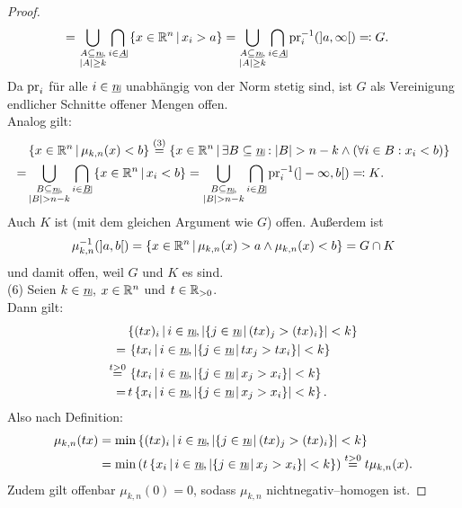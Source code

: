 \begin{proof}
\begin{align*}
=\,&\bigcup_{\substack{A \subseteq \haken n,\\ \abs A \ge k}}
\bigcap_{i \in \haken A}\menge{x \in \R^n}{x_i> a}
= \bigcup_{\substack{A \subseteq \haken n,\\ \abs A \ge k}}
\bigcap_{i \in \haken A} \pr_i\inv(]a, \infty[) \eqqcolon G\text.
\end{align*}
Da $\mathop{\textrm{pr}}\nolimits_i$ für alle $i \in \haken n$ unabhängig von der Norm stetig sind, ist
$G$ als Vereinigung endlicher Schnitte offener Mengen offen.\\
Analog gilt:
\begin{align*}
&\menge{x \in \R^n}{\mu_{k, n}(x)< b}
\overset{(3)}= \menge{x \in \R^n}{\exists B \subseteq \haken n: \abs B
>n- k \wedge (\forall i \in B: x_i < b)}\\
=&\bigcup_{\substack{B \subseteq \haken n,\\ \abs B > n - k}}
\bigcap_{i \in \haken B}\menge{x \in \R^n}{x_i< b}
= \bigcup_{\substack{B \subseteq \haken n,\\ \abs B > n - k}}
\bigcap_{i \in \haken B} \pr_i\inv(]-\infty, b[) \eqqcolon K\text.
\end{align*}
Auch $K$ ist (mit dem gleichen Argument wie $G$) offen.
Außerdem ist
\[\mu_{k,n}^{-1}(]a,b[) = \left\{x \in \mathbb{R}^n\,|\,\mu_{k,n}(x) > a \wedge
\mu_{k,n}(x) < b\right\} = G \cap K\]
und damit offen, weil $G$ und $K$ es sind.\\
(6) Seien $k \in \haken n$, $x \in \mathbb{R}^n$ und $t \in \mathbb{R}_{>0}$.\\
Dann gilt:
\begin{align*}
&\menge{(tx)_i}{i\in\haken n,\abs{\menge{j\in\haken n}{(tx)_j>(tx)_i}}<k}\\
=&\,\menge{tx_i}{i\in\haken n,\abs{\menge{j\in\haken n}{tx_j>tx_i}}<k}\\
\overset{t>0}= &\,
\menge{tx_i}{i\in\haken n,\abs{\menge{j\in\haken n}{x_j>x_i}}<k}\\
=&\, t\menge{x_i}{i\in\haken n,\abs{\menge{j\in\haken n}{x_j>x_i}}<k}\text.
\end{align*}
Also nach Definition:
\begin{align*}
\mu_{k, n}(tx) &=
\min\menge{(tx)_i}{i\in\haken n,\abs{\menge{j\in\haken n}{(tx)_j>(tx)_i}}<k}\\
&=\min
\left(t\menge{x_i}{i\in\haken n,\abs{\menge{j\in\haken n}{x_j>x_i}}<k}\right)
\overset{t>0}=t\mu_{k, n}(x)\text.
\end{align*}
Zudem gilt offenbar $\mu_{k,n}(0) = 0$, sodass $\mu_{k,n}$
nichtnegativ--homogen ist.
\end{proof}